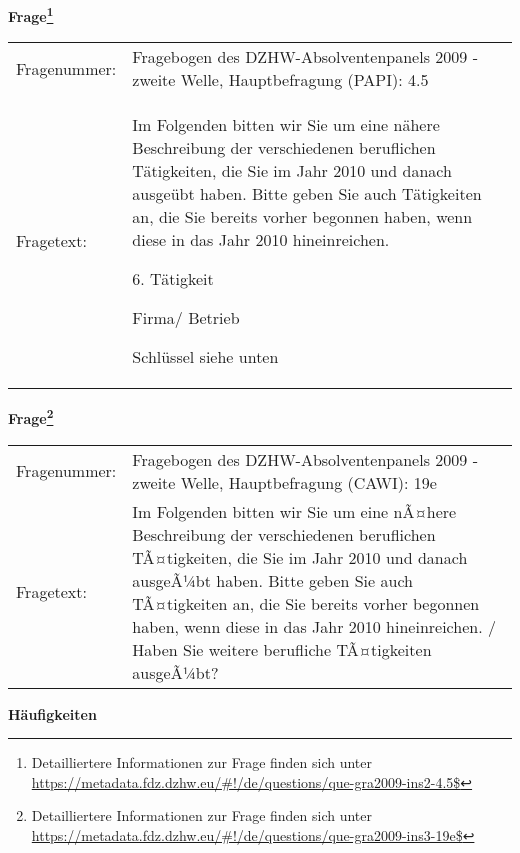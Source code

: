				\vspace*{0.5cm}
                \noindent\textbf{Frage\footnote{Detailliertere Informationen zur Frage finden sich unter
		              \url{https://metadata.fdz.dzhw.eu/\#!/de/questions/que-gra2009-ins2-4.5$}}}\\
				\begin{tabularx}{\hsize}{@{}lX}
					Fragenummer: &
					  Fragebogen des DZHW-Absolventenpanels 2009 - zweite Welle, Hauptbefragung (PAPI):
					  4.5
 \\
					Fragetext: & Im Folgenden bitten wir Sie um eine nähere Beschreibung der verschiedenen beruflichen Tätigkeiten, die Sie im Jahr 2010 und danach ausgeübt haben. Bitte geben Sie auch Tätigkeiten an, die Sie bereits vorher begonnen haben, wenn diese in das Jahr 2010 hineinreichen.\par  6. Tätigkeit\par  Firma/ Betrieb\par  Schlüssel siehe unten \\
				\end{tabularx}
				\vspace*{0.5cm}
                \noindent\textbf{Frage\footnote{Detailliertere Informationen zur Frage finden sich unter
		              \url{https://metadata.fdz.dzhw.eu/\#!/de/questions/que-gra2009-ins3-19e$}}}\\
				\begin{tabularx}{\hsize}{@{}lX}
					Fragenummer: &
					  Fragebogen des DZHW-Absolventenpanels 2009 - zweite Welle, Hauptbefragung (CAWI):
					  19e
 \\
					Fragetext: & Im Folgenden bitten wir Sie um eine nÃ¤here Beschreibung der verschiedenen beruflichen TÃ¤tigkeiten, die Sie im Jahr 2010 und danach ausgeÃ¼bt haben. Bitte geben Sie auch TÃ¤tigkeiten an, die Sie bereits vorher begonnen haben, wenn diese in das Jahr 2010 hineinreichen. / Haben Sie weitere berufliche TÃ¤tigkeiten ausgeÃ¼bt? \\
				\end{tabularx}





        		\vspace*{0.5cm}
                \noindent\textbf{Häufigkeiten}

